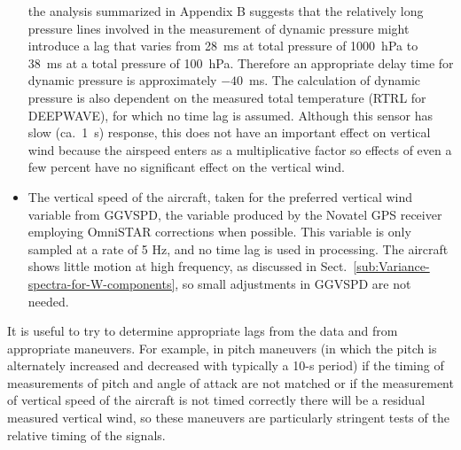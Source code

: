 \documentclass[12pt,twoside,english]{article}\usepackage[]{graphicx}\usepackage[]{color}
\let\OrgIndex\index
\renewcommand*{\index}[1]{\OrgIndex{#1}}
\begin{document}
\begin{itemize}
the analysis summarized in Appendix B suggests that the relatively long pressure lines involved in the measurement of dynamic pressure might introduce a
lag that varies from 28~ms at total pressure of 1000~hPa to 38~ms at a total pressure of 100~hPa. Therefore an appropriate delay time for dynamic pressure is approximately $-40$~ms. The calculation of dynamic pressure is also dependent on the measured total temperature (RTRL for DEEPWAVE), for which no time lag is assumed. Although this sensor has slow (ca.~1~s) response, this does not have an important effect on vertical wind because the airspeed enters as a multiplicative factor so effects of even a few percent have no significant effect on the vertical wind.
\item The vertical speed of the aircraft, taken for the preferred vertical wind variable from GGVSPD, the variable produced by the Novatel GPS receiver employing OmniSTAR corrections when possible. This variable is only sampled at a rate of 5 Hz, and no time lag is used in processing. The aircraft shows little motion at high frequency, as discussed in Sect.~\ref{sub:Variance-spectra-for-W-components}, so small adjustments in GGVSPD are not needed.

\end{itemize}
It is useful to try to determine appropriate lags from the data and from appropriate maneuvers. For example, in pitch maneuvers (in which the pitch is alternately increased and decreased with typically a 10-s period) if the timing of measurements of pitch and angle of attack are not matched or if the measurement of vertical speed of the aircraft is not timed correctly there will be a residual measured vertical wind, so these maneuvers are particularly stringent tests of the relative timing of the signals.
\end{document}
